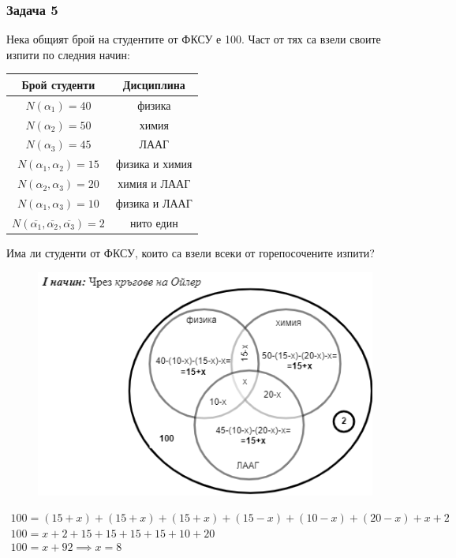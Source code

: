 \documentclass[fleqn, 12pt]{article}
\theoremstyle{definition}
\begin{document}
\subsubsection*{Задача 5}
Нека общият брой на студентите от ФКСУ е 100. Част от тях са взели своите изпити по следния начин:
\begin{center}
\begin{tabular}{|c|c|} 
\hline
Брой студенти & Дисциплина \\
\hline
$N(\alpha_1) = 40 $ & физика \\
\hline
$N(\alpha_2) = 50 $ & химия \\
\hline
$N(\alpha_3) = 45 $ & ЛААГ \\
\hline
$N(\alpha_1, \alpha_2) = 15 $ & физика и химия \\
\hline
$N(\alpha_2, \alpha_3) = 20 $ & химия и ЛААГ\\
\hline
$N(\alpha_1, \alpha_3) = 10 $ & физика и ЛААГ \\
\hline
$N(\overline{\alpha_1}, \overline{\alpha_2}, \overline{\alpha_3}) = 2 $ & нито един \\
\hline
\end{tabular}
\end{center}
Има ли студенти от ФКСУ, които са взели всеки от горепосочените изпити?
\begin{figure}[htp!]
\includegraphics{Pics/Discrete math/ex9/ex9-task5.png}
\end{figure}
\begin{gather*}
100 = (15+x) + (15+x) + (15+x) +  (15-x) +  (10-x) +  (20-x) + x + 2\\
100 = x +2 + 15 + 15 + 15 + 15 + 10 + 20 \\
100 = x + 92 \implies x = 8
\end{gather*}
\end{document}
